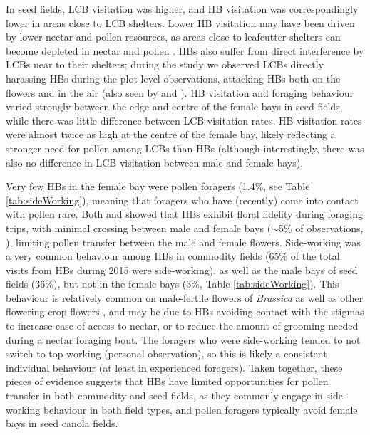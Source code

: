 \documentclass[12pt]{article} %
\begin{document}
In seed fields, LCB visitation was higher, and HB visitation was correspondingly lower in areas close to LCB shelters. 
Lower HB visitation may have been driven by lower nectar and pollen resources, as areas close to leafcutter shelters can become depleted in nectar and pollen \citep{currie1997}.
HBs also suffer from direct interference by LCBs near to their shelters; during the study we observed LCBs directly harassing HBs during the plot-level observations, attacking HBs both on the flowers and in the air (also seen by \citealp{batra1978} and \citealp{waytesMsc}). 
HB visitation and foraging behaviour varied strongly between the edge and centre of the female bays in seed fields, while there was little difference between LCB visitation rates.
HB visitation rates were almost twice as high at the centre of the female bay, likely reflecting a stronger need for pollen among LCBs than HBs \citep{cane2011} (although interestingly, there was also no difference in LCB visitation between male and female bays).

Very few HBs in the female bay were pollen foragers (1.4\%, see Table \ref{tab:sideWorking}), meaning that foragers who have (recently) come into contact with pollen rare.
Both \citet{waytesMsc} and \citet{gaffney2019} showed that HBs exhibit floral fidelity during foraging trips, with minimal crossing between male and female bays ($\sim$5\% of observations, \citealp{waytesMsc}), limiting pollen transfer between the male and female flowers.
Side-working was a very common behaviour among HBs in commodity fields (65\% of the total visits from HBs during 2015 were side-working), as well as the male bays of seed fields (36\%), but not in the female bays (3\%, Table \ref{tab:sideWorking}).
This behaviour is relatively common on male-fertile flowers of \textit{Brassica} \citep{free1973,free1983,delbrassine1988,mohr1988} as well as other flowering crop flowers \citep{thomson2001}, and may be due to HBs avoiding contact with the stigmas to increase ease of access to nectar, or to reduce the amount of grooming needed during a nectar foraging bout.
The foragers who were side-working tended to not switch to top-working (personal observation), so this is likely a consistent individual behaviour (at least in experienced foragers).
Taken together, these pieces of evidence suggests that HBs have limited opportunities for pollen transfer in both commodity and seed fields, as they commonly engage in side-working behaviour in both field types, and pollen foragers typically avoid female bays in seed canola fields.
\end{document}
